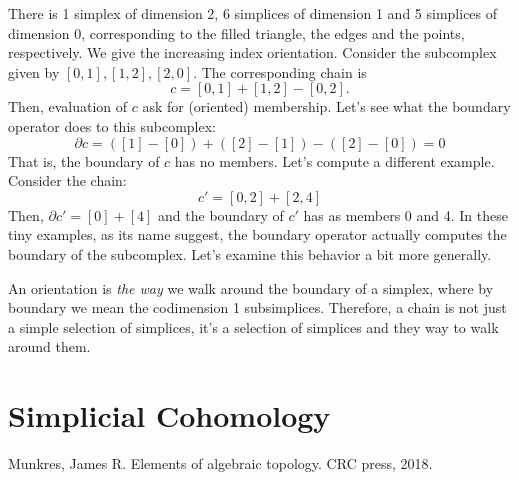 \documentclass{article}
\begin{document}
\begin{center}
\end{center}

There is 1 simplex of dimension 2, 6 simplices of dimension 1 and 5 simplices of dimension 0,
corresponding to the filled triangle, the edges and the points, respectively. We give the 
increasing index orientation. Consider the subcomplex given by \([0,1], [1,2], [2,0]\).
The corresponding chain is
\begin{displaymath}
  c = [0,1] + [1,2] - [0, 2].
\end{displaymath}
Then, evaluation of \(c\) ask for (oriented) membership. Let's see what the
boundary operator does to this subcomplex:
\begin{displaymath}
  \partial c = ([1] - [0]) + ([2] - [1]) - ([2] - [0]) = 0
\end{displaymath}
That is, the boundary of \(c\) has no members. Let's compute a different
example. Consider the chain:
\begin{displaymath}
  c' = [0, 2] + [2, 4]
\end{displaymath}
Then, \(\partial c' = [0] + [4]\) and the boundary of \(c'\) has as members 0
and 4. In these tiny examples, as its name suggest, the boundary operator
actually computes the boundary of the subcomplex. Let's examine this behavior
a bit more generally.

\medskip
An orientation is \textit{the way} we walk around the boundary of a simplex,
where by boundary we mean the codimension 1 subsimplices. Therefore, a chain is
not just a simple selection of simplices, it's a selection of simplices and
they way to walk around them. 


\section{Simplicial Cohomology}

\begin{thebibliography}{9}
  Munkres, James R. Elements of algebraic topology. CRC press, 2018.
\end{thebibliography}
\end{document}
